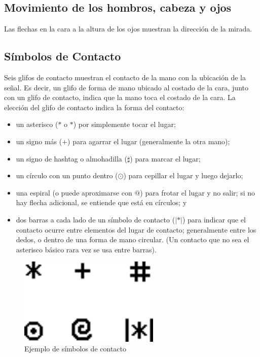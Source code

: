 \subsection{Movimiento de los hombros, cabeza y ojos}\label{subsection:state-of-the-art:sl:head_eye_shoulders}
Las flechas en la cara a la altura de los ojos muestran la dirección de la mirada. 

\subsection{Símbolos de Contacto}\label{subsection:state-of-the-art:sl:contact_symbol}

Seis glifos de contacto muestran el contacto de la mano con la ubicación de la señal. Es decir, un glifo de forma de mano ubicado al costado de la cara, junto con un glifo de contacto, indica que la mano toca el costado de la cara. La elección del glifo de contacto indica la forma del contacto:
\begin{itemize}
	\item un asterisco ($ \ast $ o $ * $) por simplemente tocar el lugar;
    \item un signo más ($ + $) para agarrar el lugar (generalmente la otra mano);
    \item un signo de hashtag o almohadilla ($ \sharp $) para marcar el lugar;
    \item un círculo con un punto dentro ($ \odot $) para cepillar el lugar y luego dejarlo;
    \item una espiral (o puede aproximarse con $ @ $) para frotar el lugar y no salir; si no hay flecha adicional, se entiende que está en círculos; y
    \item dos barras a cada lado de un símbolo de contacto ($ |\ast| $) para indicar que el contacto ocurre entre elementos del lugar de contacto; generalmente entre los dedos, o dentro de una forma de mano circular. (Un contacto que no sea el asterisco básico rara vez se usa entre barras).
\end{itemize}

\begin{figure}[ht!]
    \centering
    \includegraphics[width=0.6\textwidth]{Graphics/contact_symbols.png}
    \caption{Ejemplo de símbolos de contacto}
    \label{fig:contact_symbols}
\end{figure}

